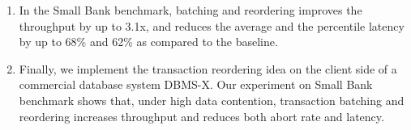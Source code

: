 \begin{enumerate}[leftmargin=*]
\item In the Small Bank benchmark, batching and reordering improves the throughput by up to 3.1x, and reduces the average and the percentile latency by up to 68\% and 62\% as compared to the baseline.
\item Finally, we implement the transaction reordering idea on the client side of a commercial database system DBMS-X. Our experiment on Small Bank benchmark shows that, under high data contention, transaction batching and reordering increases throughput and reduces both abort rate and latency.
\end{enumerate}  
